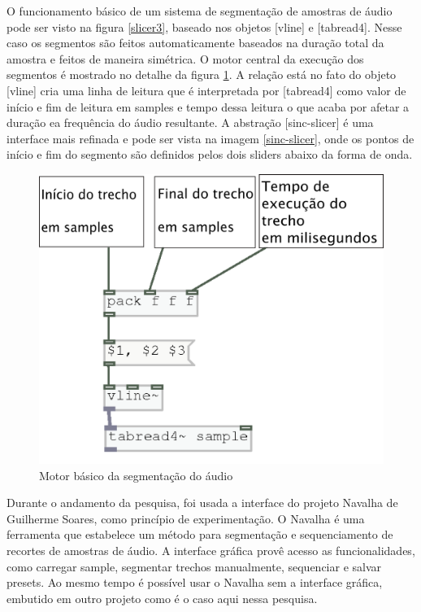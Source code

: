 \documentclass{ppgmus}
\begin{document}
O funcionamento básico de um sistema de segmentação de amostras de áudio pode ser visto na figura \ref{slicer3},
baseado nos objetos [vline\texttildelow] e [tabread4\texttildelow]. Nesse caso os segmentos são feitos
automaticamente baseados na duração total da amostra e feitos de maneira simétrica.
O motor central da execução dos segmentos é mostrado no detalhe da figura \ref{slice-motor}.
A relação está no fato do objeto [vline\texttildelow] cria uma linha de leitura que é interpretada
por [tabread4\texttildelow] como valor de início e fim de leitura em samples e tempo dessa
leitura o que acaba por afetar a duração ea frequência do áudio resultante. 
A abstração [sinc-slicer] é uma interface mais refinada e pode ser vista na imagem \ref{sinc-slicer}, 
onde os pontos de início e fim do segmento são definidos pelos dois sliders abaixo da forma de onda.

\begin{figure}
\includegraphics[scale=.6]{slice-motor}
\caption{Motor básico da segmentação do áudio}
\label{slice-motor}
\end{figure}

Durante o andamento da pesquisa, foi usada a interface do projeto Navalha de Guilherme Soares,
como princípio de experimentação.
O Navalha é uma ferramenta que estabelece
um método para segmentação e sequenciamento de recortes de amostras de áudio. A interface gráfica
provê acesso as funcionalidades, como carregar sample, segmentar trechos manualmente, sequenciar e 
salvar presets. Ao mesmo tempo é possível usar o Navalha sem a interface gráfica, embutido em outro
projeto como é o caso aqui nessa pesquisa.
\end{document}
